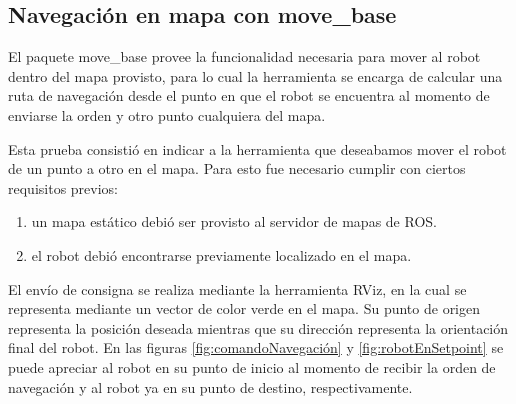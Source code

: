 \subsection{Navegación en mapa con move\_base}

El paquete move\_base provee la funcionalidad necesaria para mover al robot dentro del mapa provisto, para lo cual la herramienta se encarga de calcular una ruta de navegación desde el punto en que el robot se encuentra al momento de enviarse la orden y otro punto cualquiera del mapa.

Esta prueba consistió en indicar a la herramienta que deseabamos mover el robot de un punto a otro en el mapa. Para esto fue necesario cumplir con ciertos requisitos previos:

\begin{enumerate}
    \item un mapa estático debió ser provisto al servidor de mapas de ROS.
    \item el robot debió encontrarse previamente localizado en el mapa.
\end{enumerate}

El envío de consigna se realiza mediante la herramienta RViz, en la cual se representa mediante un vector de color verde en el mapa. Su punto de origen representa la posición deseada mientras que su dirección representa la orientación final del robot. En las figuras \ref{fig:comandoNavegación} y \ref{fig:robotEnSetpoint} se puede apreciar al robot en su punto de inicio al momento de recibir la orden de navegación y al robot ya en su punto de destino, respectivamente.


